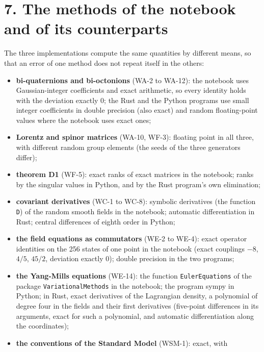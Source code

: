 \documentclass[
  10pt,
]{article}
\providecommand{\tightlist}{%
  \setlength{\itemsep}{0pt}\setlength{\parskip}{0pt}}
\begin{document}
\hypertarget{the-methods-of-the-notebook-and-of-its-counterparts}{%
\section{7. The methods of the notebook and of its
counterparts}\label{the-methods-of-the-notebook-and-of-its-counterparts}}

The three implementations compute the same quantities by different
means, so that an error of one method does not repeat itself in the
others:

\begin{itemize}
\tightlist
\item
  \textbf{bi-quaternions and bi-octonions} (WA-2 to WA-12): the notebook
  uses Gaussian-integer coefficients and exact arithmetic, so every
  identity holds with the deviation exactly 0; the Rust and the Python
  programs use small integer coefficients in double precision (also
  exact) and random floating-point values where the notebook uses exact
  ones;
\item
  \textbf{Lorentz and spinor matrices} (WA-10, WF-3): floating point in
  all three, with different random group elements (the seeds of the
  three generators differ);
\item
  \textbf{theorem D1} (WF-5): exact ranks of exact matrices in the
  notebook; ranks by the singular values in Python, and by the Rust
  program's own elimination;
\item
  \textbf{covariant derivatives} (WC-1 to WC-8): symbolic derivatives
  (the function \texttt{D}) of the random smooth fields in the notebook;
  automatic differentiation in Rust; central differences of eighth order
  in Python;
\item
  \textbf{the field equations as commutators} (WE-2 to WE-4): exact
  operator identities on the 256 states of one point in the notebook
  (exact couplings \(-8\), \(4/5\), \(45/2\), deviation exactly 0);
  double precision in the two programs;
\item
  \textbf{the Yang-Mills equations} (WE-14): the function
  \texttt{EulerEquations} of the package \texttt{VariationalMethods} in
  the notebook; the program sympy in Python; in Rust, exact derivatives
  of the Lagrangian density, a polynomial of degree four in the fields
  and their first derivatives (five-point differences in its arguments,
  exact for such a polynomial, and automatic differentiation along the
  coordinates);
\item
  \textbf{the conventions of the Standard Model} (WSM-1): exact, with

\end{itemize}
\end{document}

